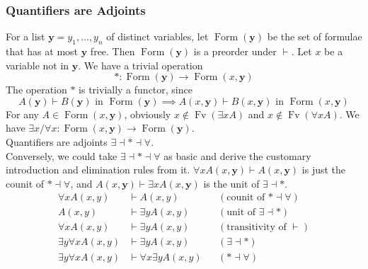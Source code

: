 \documentclass[UTF8,11pt,colorlinks,compress,openany]{beamer}%
\begin{document}
\begin{frame}\frametitle{Quantifiers are Adjoints}
\setlength\abovedisplayskip{0pt}
\setlength\belowdisplayskip{0pt}
For a list $\mathbf{y}=y_1,\dots,y_n$ of distinct variables, let $\operatorname{Form}(\mathbf{y})$ be the set of formulae that has at most $\mathbf{y}$ free. Then $\operatorname{Form}(\mathbf{y})$ is a preorder under $\vdash$. Let $x$ be a variable not in $\mathbf{y}$. We have a trivial operation
\[*:\operatorname{Form}(\mathbf{y})\to\operatorname{Form}(x,\mathbf{y})\]
The operation $*$ is trivially a functor, since
\[A(\mathbf{y})\vdash B(\mathbf{y}) \mbox{ in } \operatorname{Form}(\mathbf{y})\implies A(x,\mathbf{y})\vdash B(x,\mathbf{y}) \mbox{ in } \operatorname{Form}(x,\mathbf{y})\]
For any $A\in\operatorname{Form}(x,\mathbf{y})$, obviously $x\notin\operatorname{Fv}(\exists x A)$ and $x\notin\operatorname{Fv}(\forall x A)$. We have $\exists x/\forall x:\operatorname{Form}(x,\mathbf{y})\to\operatorname{Form}(\mathbf{y})$.\\
Quantifiers are adjoints $\exists\dashv *\dashv\forall$.\\
Conversely, we could take $\exists\dashv *\dashv\forall$ as basic and derive the customary introduction and elimination rules from it. $\forall xA(x,\mathbf{y})\vdash A(x,\mathbf{y})$ is just the counit of $*\dashv\forall$, and $A(x,\mathbf{y})\vdash\exists xA(x,\mathbf{y})$ is the unit of $\exists\dashv *$.
{\small \begin{align*}
	\forall x A(x,y)&\vdash A(x,y) &&(\mbox{counit of } *\dashv\forall)\\
	A(x,y)&\vdash\exists yA(x,y) &&(\mbox{unit of } \exists\dashv *)\\
	\forall xA(x,y)&\vdash\exists yA(x,y) &&(\mbox{transitivity of } \vdash)\\
	\exists y\forall xA(x,y)&\vdash \exists yA(x,y) &&(\exists\dashv*)\\
	\exists y\forall xA(x,y)&\vdash \forall x\exists yA(x,y) &&(*\dashv\forall)
\end{align*}}
\end{frame}
\end{document}
